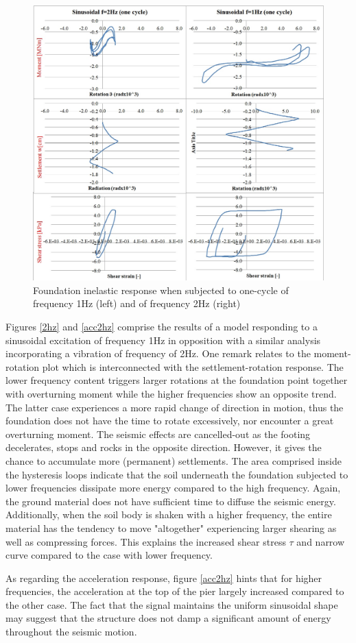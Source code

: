  
 \begin{figure}[!h]
 	\centering
 	\includegraphics[width=0.6\linewidth]{"sinusoidal2"}
 	\caption{Foundation inelastic response when subjected to one-cycle of frequency 1Hz (left) and of frequency 2Hz (right)}
 	\label{sinus}
 \end{figure}
 Figures \ref{2hz} and \ref{acc2hz} comprise the results of a model responding to a sinusoidal excitation of frequency 1Hz in opposition with a similar analysis incorporating a vibration of frequency of 2Hz. One remark relates to the moment-rotation plot which is interconnected with the settlement-rotation response. The lower frequency content triggers larger rotations at the foundation point together with overturning moment while the higher frequencies show an opposite trend. The latter case experiences a more rapid change of direction in motion, thus the foundation does not have the time to rotate excessively, nor encounter a great overturning moment. The seismic effects are cancelled-out as the footing decelerates, stops and rocks in the opposite direction. However, it gives the chance to accumulate more (permanent) settlements. The area comprised inside the hysteresis loops indicate that the soil underneath the foundation subjected to lower frequencies dissipate more energy compared to the high frequency. Again, the ground material does not have sufficient time to diffuse the seismic energy. Additionally, when the soil body is shaken with a higher frequency, the entire material has the tendency to move "altogether" experiencing larger shearing as well as compressing forces. This explains the increased shear stress $\tau$ and narrow curve compared to the case with lower frequency. 
 
 As regarding the acceleration response, figure \ref{acc2hz} hints that for higher frequencies, the acceleration at the top of the pier largely increased compared to the other case. The fact that the signal maintains the uniform sinusoidal shape may suggest that the structure does not damp a significant amount of energy throughout the seismic motion.
 
